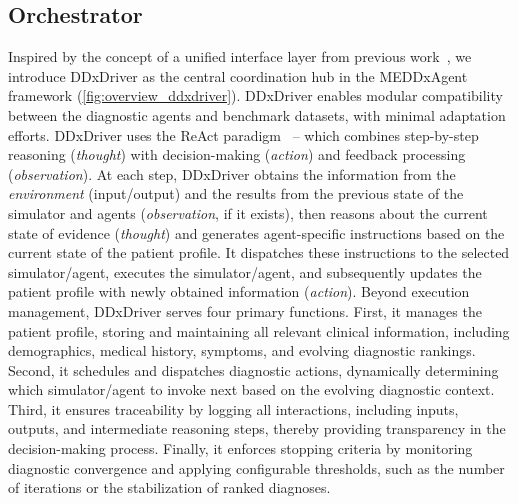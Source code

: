 \vspace{-0.5em}
\subsection{Orchestrator} 
\label{subsec:ddxdriver}

Inspired by the concept of a unified interface layer from previous work~\citep{gioacchini-etal-2024-agentquest}, we introduce DDxDriver as the central coordination hub in the MEDDxAgent framework (\autoref{fig:overview_ddxdriver}). DDxDriver enables modular compatibility between the diagnostic agents and benchmark datasets, with minimal adaptation efforts. 
DDxDriver uses the ReAct paradigm~\citep{yao2023react} -- which combines step-by-step reasoning (\textit{thought}) with decision-making (\textit{action}) and feedback processing (\textit{observation}). At each step, DDxDriver obtains the information from the \textit{environment} (input/output) and the results from the previous state of the simulator and agents (\textit{observation}, if it exists), then reasons about the current state of evidence (\textit{thought}) and generates agent-specific instructions based on the current state of the patient profile. It dispatches these instructions to the selected simulator/agent, executes the simulator/agent, and subsequently updates the patient profile with newly obtained information (\textit{action}). 
Beyond execution management, DDxDriver serves four primary functions. First, it manages the patient profile, storing and maintaining all relevant clinical information, including demographics, medical history, symptoms, and evolving diagnostic rankings. Second, it schedules and dispatches diagnostic actions, dynamically determining which simulator/agent to invoke next based on the evolving diagnostic context. Third, it ensures traceability by logging all interactions, including inputs, outputs, and intermediate reasoning steps, thereby providing transparency in the decision-making process. Finally, it enforces stopping criteria by monitoring diagnostic convergence and applying configurable thresholds, such as the number of iterations or the stabilization of ranked diagnoses.



